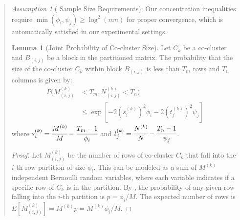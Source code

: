 \documentclass{ar2rc}
\theoremstyle{definition}
\newtheorem*{lemma*}{Lemma}
\theoremstyle{remark} %
\newtheorem*{assumption*}{Assumption}
\begin{document}
\begin{quote}
  \begin{assumption*}[ Sample Size Requirements]
    Our concentration inequalities require $\min(\phi_i, \psi_j) \geq \log^2(mn)$ for proper convergence, which is automatically satisfied in our experimental settings.
  \end{assumption*}


  \begin{lemma*}[Joint Probability of Co-cluster Size]
    Let $C_k$ be a co-cluster and $B_{(i,j)}$ be a block in the partitioned matrix. The probability that the size of the co-cluster $C_k$ within block $B_{(i,j)}$ is less than $T_m$ rows and $T_n$ columns is given by:
    \begin{equation}
      \begin{aligned}
        P(M_{(i,j)}^{(k)} & < T_m, N_{(i,j)}^{(k)} < T_n)                                         \\
                          & \leq \exp\left[-2 (s_i^{(k)})^2 \phi_i -2 (t_j^{(k)})^2 \psi_j\right]
      \end{aligned}
    \end{equation}
    where $s_i^{(k)} = \cfrac{M^{(k)}}{M} - \cfrac{T_m-1}{\phi_i}$ and $t_j^{(k)} = \cfrac{N^{(k)}}{N} - \cfrac{T_n-1}{\psi_j}$.
  \end{lemma*}


  \begin{proof}
    Let $M_{(i,j)}^{(k)}$ be the number of rows of co-cluster $C_k$ that fall into the $i$-th row partition of size $\phi_i$. This can be modeled as a sum of $M^{(k)}$ independent Bernoulli random variables, where each variable indicates if a specific row of $C_k$ is in the partition. By , the probability of any given row falling into the $i$-th partition is $p = \phi_i / M$. The expected number of rows is $E[M_{(i,j)}^{(k)}] = M^{(k)} p = M^{(k)} \phi_i / M$.


\end{proof}
\end{quote}
\end{document}
